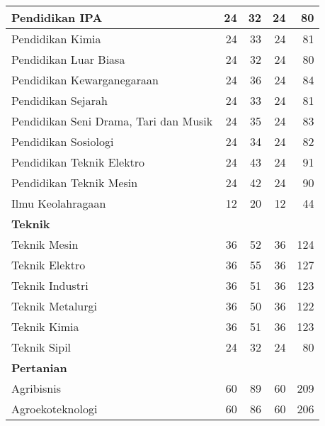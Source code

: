 \documentclass[
]{book}
\begin{document}
\begin{table}[H]
{\begin{tabular}{l|r|r|r|r}
\hline
\hspace{1em}Pendidikan IPA & 24 & 32 & 24 & 80\\
\hline
\hspace{1em}Pendidikan Kimia & 24 & 33 & 24 & 81\\
\hline
\hspace{1em}Pendidikan Luar Biasa & 24 & 32 & 24 & 80\\
\hline
\hspace{1em}Pendidikan Kewarganegaraan & 24 & 36 & 24 & 84\\
\hline
\hspace{1em}Pendidikan Sejarah & 24 & 33 & 24 & 81\\
\hline
\hspace{1em}Pendidikan Seni Drama, Tari dan Musik & 24 & 35 & 24 & 83\\
\hline
\hspace{1em}Pendidikan Sosiologi & 24 & 34 & 24 & 82\\
\hline
\hspace{1em}Pendidikan Teknik Elektro & 24 & 43 & 24 & 91\\
\hline
\hspace{1em}Pendidikan Teknik Mesin & 24 & 42 & 24 & 90\\
\hline
\hspace{1em}Ilmu Keolahragaan & 12 & 20 & 12 & 44\\
\hline
\multicolumn{5}{l}{\textbf{Teknik}}\\
\hline
\hspace{1em}Teknik Mesin & 36 & 52 & 36 & 124\\
\hline
\hspace{1em}Teknik Elektro & 36 & 55 & 36 & 127\\
\hline
\hspace{1em}Teknik Industri & 36 & 51 & 36 & 123\\
\hline
\hspace{1em}Teknik Metalurgi & 36 & 50 & 36 & 122\\
\hline
\hspace{1em}Teknik Kimia & 36 & 51 & 36 & 123\\
\hline
\hspace{1em}Teknik Sipil & 24 & 32 & 24 & 80\\
\hline
\multicolumn{5}{l}{\textbf{Pertanian}}\\
\hline
\hspace{1em}Agribisnis & 60 & 89 & 60 & 209\\
\hline
\hspace{1em}Agroekoteknologi & 60 & 86 & 60 & 206\\

\end{tabular}}
\end{table}
\end{document}

